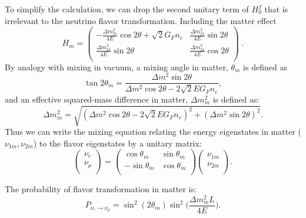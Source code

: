 To simplify the calculation, we can drop the second unitary term of $H^f_0$ that is irrelevant to the neutrino flavor transformation. Including the matter effect
\begin{equation}\label{eq:Hm}
	H_m = \begin{pmatrix}
		-\frac{\Delta m_{21}^2}{4E}\cos 2\theta+\sqrt 2G_Fn_e & \frac{\Delta m_{21}^2}{4E}\sin 2\theta\\
		\frac{\Delta m_{21}^2}{4E}\sin 2\theta &\frac{\Delta m_{21}^2}{4E}\cos 2\theta\\
	\end{pmatrix} \; .
\end{equation}
By analogy with mixing in vacuum, a mixing angle in matter, $\theta_m$ is defined as
\begin{equation}\label{eq:thetaM}
	\tan 2\theta_m = \frac{\Delta m^2\sin2\theta}{\Delta m^2\cos2\theta-2\sqrt 2E G_Fn_e},
\end{equation}
and an effective squared-mass difference in matter, $\Delta m^2_m$ is defined as:
\begin{equation}
	\Delta m^2_m = \sqrt{(\Delta m^2\cos2\theta - 2\sqrt 2EG_Fn_e)^2+(\Delta m^2\sin2\theta)^2}.
\end{equation}
Thus we can write the mixing equation relating the energy eigenstates in matter ($\nu_{1m},\nu_{2m}$) to the flavor eigenstates by a unitary matrix:
\begin{equation}\label{eq:matter_mixing}
	\begin{pmatrix}
		\nu_e\\
		\nu_\mu\\
	\end{pmatrix}
	= \begin{pmatrix}
		\cos\theta_m & \sin\theta_m\\
		-\sin\theta_m & \cos\theta_m \\
	\end{pmatrix}
	\begin{pmatrix}
		\nu_{1m}\\
		\nu_{2m}\\
	\end{pmatrix}.
\end{equation}

The probability of flavor transformation in matter is:
\begin{equation}
	P_{\nu_e\to\nu_{\mu}}=\sin^2(2\theta_m)\sin^2\Big(\frac{\Delta m_m^2L}{4E}\Big).
\end{equation}


